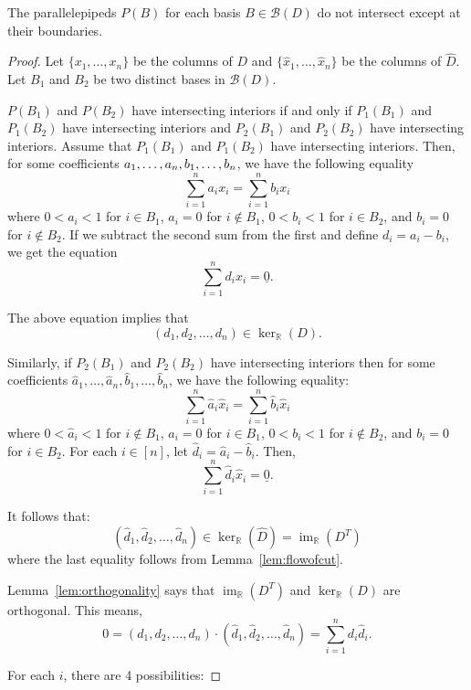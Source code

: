 \documentclass[ALCO,ThmDefs,Unicode,epreuves]{cedram}
\newcommand{\un}{\underline}
\newcommand{\R}{\mathbb{R}}
\newcommand{\B}{\mathcal{B}}
\newcommand{\col}[1]{x_{#1}}
\newcommand{\hcol}[1]{\widehat x_{#1}}
\DeclareMathOperator{\Ima}{im}
\begin{document}
\begin{prop}\label{prop:nointersect}
The parallelepipeds $P(B)$ for each basis $B\in \B(D)$ do not intersect except at their boundaries.
\end{prop}
\begin{proof}
Let $\{\col 1,\dots, \col n\}$ be the columns of $D$ and $\{\hcol 1,\dots, \hcol n\}$ be the columns of $\widehat D$. Let $B_1$ and $B_2$ be two distinct bases in $\B(D)$. 

$P(B_1)$ and $P(B_2)$ have intersecting interiors if and only if $P_1(B_1)$ and $P_1(B_2)$ have intersecting interiors and $P_2(B_1)$ and $P_2(B_2)$ have intersecting interiors. Assume that $P_1(B_1)$ and $P_1(B_2)$ have intersecting interiors. Then, for some coefficients $a_1,\dots,a_{n},\\
b_1,\dots,b_{n}$, we have the following equality
\[
\sum_{i=1}^{n} a_i \col i = \sum_{i=1}^{n} b_i \col i
\]
where $0 < a_i < 1$ for $i \in B_1$, $a_i = 0$ for $i \not\in B_1$, $0 < b_i < 1$ for $i \in B_2$, and $b_i =0 $ for $i \not\in B_2$. If we subtract the second sum from the first and define $d_i = a_i - b_i$, we get the equation
\[
\sum_{i=1}^{n} d_i \col i=\un 0.
\]

The above equation implies that
\[
(d_1,d_2,\dots,d_n)\in \ker_\mathbb R (D).
\]

Similarly, if $P_2(B_1)$ and $P_2(B_2)$ have intersecting interiors then for some coefficients $\widehat a_1,\dots,\widehat a_{n},
\widehat b_1,\dots,\widehat b_{n}$, we have the following equality:
\[
\sum_{i=1}^{n} \widehat a_i\hcol i = \sum_{i=1}^{n} \widehat b_i\hcol i
\]
where $0 < \widehat a_i <1$ for $i \not\in B_1$, $a_i = 0$ for $i \in B_1$, $0 < b_i < 1$ for $i \not\in B_2$, and $b_i =0 $ for $i \in B_2$. For each $i \in [n]$, let $\widehat d_i = \widehat a_i - \widehat b_i$. Then,
\[
\sum_{i=1}^{n} \widehat d_i\hcol i=\un 0.
\]

It follows that:
\[
(\widehat d_1,\widehat d_2,\dots,\widehat d_n)\in \ker_\mathbb R (\widehat D) = \Ima_\R(D^T)
\]
where the last equality follows from Lemma~\ref{lem:flowofcut}.

Lemma~\ref{lem:orthogonality} says that $\Ima_\R(D^T)$ and $\ker_\R(D)$ are orthogonal. This means,
\[
0 = (d_1,d_2,\dots,d_n) \cdot(\widehat d_1,\widehat d_2,\dots,\widehat d_n) = \sum_{i=1}^{n} d_i\widehat d_i.
\]

For each $i$, there are 4 possibilities:

\begingroup
\setcounter{cdrthm}{0}
\renewcommand\thecdrthm{\arabic{cdrthm}}


\end{proof}
\end{document}
